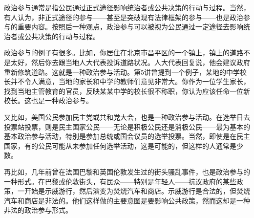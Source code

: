 





政治参与通常是指公民通过正式途径影响统治者或公共决策的行动与过程。当然，有人认为，非正式途径的参与——甚至是突破现有法律框架的参与——也是政治参与的重要内容。按照后一种观点，政治参与可以被视为公民通过一定途径去影响统治者或公共决策的行动与过程。

政治参与的例子有很多。比如，你居住在北京市昌平区的一个镇上，镇上的道路不是太好，然后你去跟当地人大代表投诉道路状况。人大代表回复说，他会建议政府重新修筑道路。这就是一种政治参与活动。第5讲曾提到一个例子，某地的中学校长并不令人满意，当地的家长和中学的教师们意见非常大。你作为一位学生家长，找到当地主管教育的官员，反映某某中学的校长很不称职，你认为应该任命一位新校长。这也是一种政治参与。

又比如，美国公民参加民主党或共和党大会，也是一种政治参与活动。在选举日去投票站投票，则是民主国家公民——无论是积极公民还是消极公民——最为基本的基本政治参与活动，特别是参加总统或国会议员的选举投票。当然，即使是在民主国家，有的公民可能从未参加任何选举活动，这是可能的，但这样的人通常是少数。

再比如，几年前曾在法国巴黎和英国伦敦发生过的街头骚乱事件，也是政治参与的一种形式。在巴黎或伦敦街头，有民众——特别是年轻人——抗议政府的某些政策，一开始是示威游行，然后演变为焚烧汽车和商店。示威游行是合法的，但焚烧汽车和商店是非法的。他们这样做的主要意图是要影响公共政策，然而这却是一种非法的政治参与形式。


